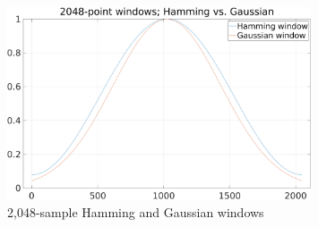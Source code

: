 \documentclass[report.tex]{subfiles}
\begin{document}
\begin{figure}[ht]
	\centering
	\includegraphics[width=0.8\textwidth]{./images-tftheory/hamming_vs_gauss.png}
	\caption{2,048-sample Hamming and Gaussian windows}
	\label{fig:gaussvshamm}
\end{figure}

\newpagefill
\end{document}
